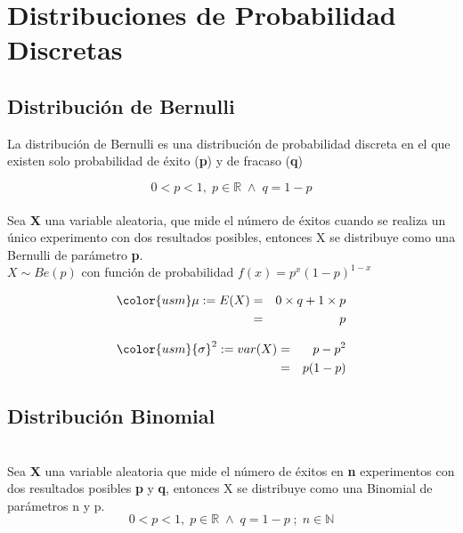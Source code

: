 \section{Distribuciones de Probabilidad Discretas}

    \subsection{Distribución de Bernulli}
    La distribución de Bernulli es una distribución de probabilidad discreta en el que existen solo probabilidad de éxito (\textbf{p}) y de fracaso (\textbf{q})
    
    $$0<p<1, \;p \in \mathbb{R} \; \wedge \; q=1-p$$\\
    
    Sea \textbf{X} una variable aleatoria, que mide el número de éxitos cuando se realiza un único experimento con dos resultados posibles, entonces X se distribuye como una Bernulli de parámetro \textbf{p}.\\
    
    $X \sim Be(p)$ con función de probabilidad {\color{usm} $f\left( x \right) ={ p }^{ x }{ (1-p) }^{ 1-x }$} \\
    
          \begin{minipage}[b]{\textwidth}
\begin{minipage}[b]{0.5 \textwidth}
 \begin{eqnarray*}
        {\color{usm}\mu} :=E(X) & = & 0\times q+1\times p\\
                                & = & p
    \end{eqnarray*}
\end{minipage} \hfill \begin{minipage}[b]{0.5 \textwidth}
\begin{eqnarray*}
        {\color{usm}{ \sigma  }^{ 2 }} := var(X) & = & p-{p}^{2}\\
                                                & = & p(1-p)
    \end{eqnarray*}
\end{minipage}
\end{minipage}
\newpage    

    \subsection{Distribución Binomial}\\
    
    Sea \textbf{X} una variable aleatoria que mide el número de éxitos en \textbf{n} experimentos con dos resultados posibles \textbf{p} y \textbf{q}, entonces X se distribuye como una Binomial de parámetros n y p.\\
    $$0<p<1, \;p \in \mathbb{R} \; \wedge \; q=1-p \; ; \; n \in \mathbb{N}$$\\
    
